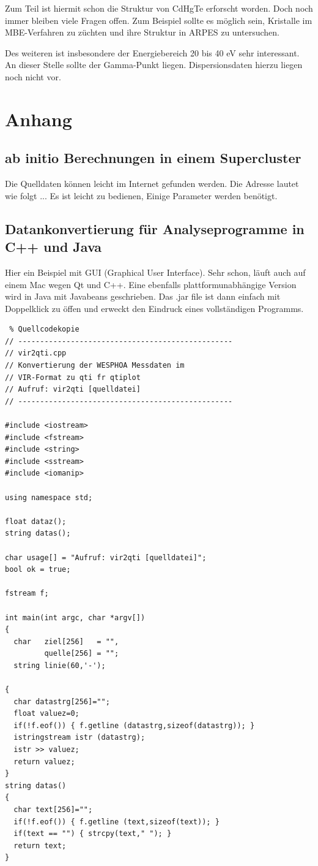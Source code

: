 \documentclass[11pt,twoside,german]{book}
\begin{document}
Zum Teil ist hiermit schon die Struktur von CdHgTe erforscht worden. Doch noch immer bleiben viele Fragen offen. Zum Beispiel sollte es möglich sein, Kristalle im MBE-Verfahren zu züchten und ihre Struktur in ARPES zu untersuchen.

Des weiteren ist insbesondere der Energiebereich 20 bis 40 eV sehr interessant. An dieser Stelle sollte der Gamma-Punkt liegen. Dispersionsdaten hierzu liegen noch nicht vor.

\chapter{Anhang}
\section{ab initio Berechnungen in einem Supercluster}

Die Quelldaten können leicht im Internet gefunden werden. Die Adresse lautet wie folgt ... Es ist leicht zu bedienen, Einige Parameter werden benötigt.

\section{Datankonvertierung für Analyseprogramme in C++ und Java}

Hier ein Beispiel mit GUI (Graphical User Interface). Sehr schon, läuft auch auf einem Mac wegen Qt und C++. Eine ebenfalls plattformunabhängige Version wird in Java mit Javabeans geschrieben. Das .jar file ist dann einfach mit Doppelklick zu öffen und erweckt den Eindruck eines vollständigen Programms.

\tiny
\begin{verbatim} % Quellcodekopie
// -------------------------------------------------
// vir2qti.cpp
// Konvertierung der WESPHOA Messdaten im
// VIR-Format zu qti fr qtiplot
// Aufruf: vir2qti [quelldatei]
// -------------------------------------------------

#include <iostream>
#include <fstream>
#include <string>
#include <sstream>
#include <iomanip>

using namespace std;

float dataz();
string datas();

char usage[] = "Aufruf: vir2qti [quelldatei]";
bool ok = true;

fstream f;

int main(int argc, char *argv[])
{
  char   ziel[256]   = "",
         quelle[256] = "";
  string linie(60,'-');

{
  char datastrg[256]="";
  float valuez=0;
  if(!f.eof()) { f.getline (datastrg,sizeof(datastrg)); }
  istringstream istr (datastrg);
  istr >> valuez;
  return valuez;
}
string datas()
{
  char text[256]="";
  if(!f.eof()) { f.getline (text,sizeof(text)); }
  if(text == "") { strcpy(text," "); }
  return text;
}
\end{verbatim}
\normalsize
\end{document}
